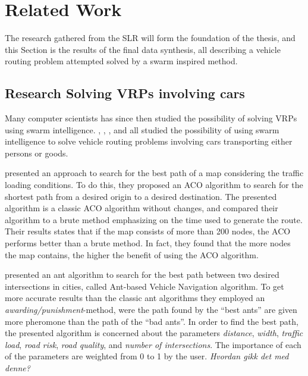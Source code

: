 \section{Related Work}
\label{sec:relatedWork}

The research gathered from the SLR will form the foundation of the thesis, and this Section is the results of the final data synthesis, all describing a vehicle routing problem attempted solved by a swarm inspired method. 


\subsection{Research Solving VRPs involving cars}

Many computer scientists has since then studied the possibility of solving VRPs using swarm intelligence. \citet{hsiao04}, \citet{salehi-nezhad07}, \citet{tripathi09}, \citet{salehinejad10} and \citet{sedighpour14} all studied the possibility of using swarm intelligence to solve vehicle routing problems involving cars transporting either persons or goods.

\citet{hsiao04} presented an approach to search for the best path of a map considering the traffic loading conditions. To do this, they proposed an ACO algorithm to search for the shortest path from a desired origin to a desired destination. The presented algorithm is a classic ACO algorithm without changes, and compared their algorithm to a brute method emphasizing on the time used to generate the route. Their results states that if the map consists of more than 200 nodes, the ACO performs better than a brute method. In fact, they found that the more nodes the map contains, the higher the benefit of using the ACO algorithm. 

\citet{salehi-nezhad07} presented an ant algorithm to search for the best path between two desired  intersections in cities, called Ant-based Vehicle Navigation algorithm. To get more accurate results than the classic ant algorithms they employed an \textit{awarding/punishment}-method, were the path found by the ``best ants'' are given more pheromone than the path of the ``bad ants''. In order to find the best path, the presented algorithm is concerned about the parameters \textit{distance}, \textit{width}, \textit{traffic load}, \textit{road risk}, \textit{road quality}, and \textit{number of intersections}. The importance of each of the parameters are weighted from 0 to 1 by the user. \emph{\color{blue} Hvordan gikk det med denne?}

